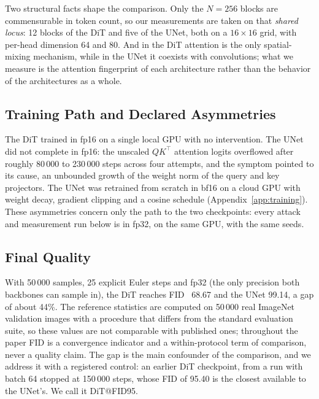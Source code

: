 \documentclass{article}
\begin{document}
Two structural facts shape the comparison. Only the $N{=}256$ blocks are commensurable in token count, so our measurements are taken on that \textit{shared locus}: 12 blocks of the DiT and five of the UNet, both on a $16{\times}16$ grid, with per-head dimension 64 and 80. And in the DiT attention is the only spatial-mixing mechanism, while in the UNet it coexists with convolutions; what we measure is the attention fingerprint of each architecture rather than the behavior of the architectures as a whole.

\subsection{Training Path and Declared Asymmetries}

The DiT trained in fp16 on a single local GPU with no intervention. The UNet did not complete in fp16: the unscaled $QK^\top$ attention logits overflowed after roughly 80\,000 to 230\,000 steps across four attempts, and the symptom pointed to its cause, an unbounded growth of the weight norm of the query and key projectors. The UNet was retrained from scratch in bf16 on a cloud GPU with weight decay, gradient clipping and a cosine schedule (Appendix~\ref{app:training}). These asymmetries concern only the path to the two checkpoints: every attack and measurement run below is in fp32, on the same GPU, with the same seeds.

\subsection{Final Quality}

With 50\,000 samples, 25 explicit Euler steps and fp32 (the only precision both backbones can sample in), the DiT reaches FID~\cite{heusel2017gans} 68.67 and the UNet 99.14, a gap of about 44\%. The reference statistics are computed on 50\,000 real ImageNet validation images with a procedure that differs from the standard evaluation suite, so these values are not comparable with published ones; throughout the paper FID is a convergence indicator and a within-protocol term of comparison, never a quality claim. The gap is the main confounder of the comparison, and we address it with a registered control: an earlier DiT checkpoint, from a run with batch 64 stopped at 150\,000 steps, whose FID of 95.40 is the closest available to the UNet's. We call it DiT@FID95.

\end{document}
